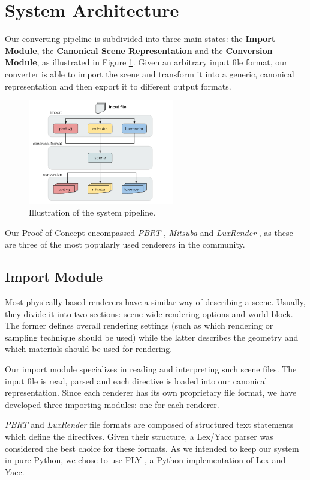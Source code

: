 \section{System Architecture}
Our converting pipeline is subdivided into three main states: the \textbf{Import 
Module}, the \textbf{Canonical Scene Representation} and the \textbf{Conversion 
Module}, as illustrated in Figure \ref{fig:sysarch}. Given an arbitrary input 
file format, our converter is able to import the scene and transform it into a 
generic, canonical representation and then export it to different output 
formats. 

\begin{figure}[h]
\centering
\includegraphics[width=2.5in]{figs/3_system_architecture/architecture.png}
\caption{Illustration of the system pipeline.}
\label{fig:sysarch}
\end{figure}

Our Proof of Concept encompassed \textit{PBRT} \cite{pbrt}, \textit{Mitsuba} 
\cite{mitsuba} and \textit{LuxRender} \cite{luxrender}, as these are three of 
the most popularly used renderers in the community.

\subsection{Import Module}
Most physically-based renderers have a similar way of describing a scene. 
Usually, they divide it into two sections: scene-wide rendering options and 
world block. The former defines overall rendering settings (such as which 
rendering or sampling technique should be used) while the latter describes the 
geometry and which materials should be used for rendering.

Our import module specializes in reading and interpreting such scene files. The 
input file is read, parsed and each directive is loaded into our canonical  
representation. Since each renderer has its own proprietary file format, we have 
developed three importing modules: one for each renderer.

\textit{PBRT} and \textit{LuxRender} file formats are composed of structured 
text statements which define the directives. Given their structure, a Lex/Yacc 
parser was considered the best choice for these formats. As we intended to keep 
our system in pure Python, we chose to use PLY \cite{ply}, a Python 
implementation of Lex and Yacc.

